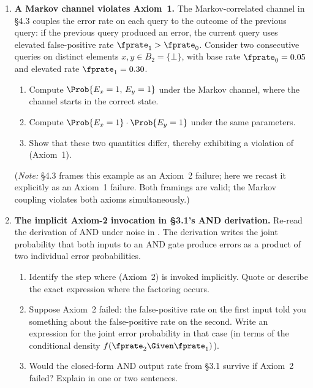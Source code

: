 \begin{enumerate}
\item \exstarstar
\textbf{A Markov channel violates Axiom~1.}
The Markov-correlated channel in §4.3 couples the error rate on each query
to the outcome of the previous query: if the previous query produced an error,
the current query uses elevated false-positive rate $\fprate_1 > \fprate_0$.
Consider two consecutive queries on distinct elements $x, y \in B_2 = \{\bot\}$,
with base rate $\fprate_0 = 0.05$ and elevated rate $\fprate_1 = 0.30$.
\begin{enumerate}
  \item[(a)] Compute $\Prob{E_x = 1,\, E_y = 1}$ under the Markov channel,
    where the channel starts in the correct state.
  \item[(b)] Compute $\Prob{E_x = 1} \cdot \Prob{E_y = 1}$ under the same
    parameters.
  \item[(c)] Show that these two quantities differ, thereby exhibiting a
    violation of  (Axiom~1).
\end{enumerate}
(\textit{Note:} §4.3 frames this example as an Axiom~2 failure; here we recast
it explicitly as an Axiom~1 failure. Both framings are valid; the Markov
coupling violates both axioms simultaneously.)

\item \exstarstar
\textbf{The implicit Axiom-2 invocation in §3.1's AND derivation.}
Re-read the derivation of AND under noise in .
The derivation writes the joint probability that both inputs to an AND gate
produce errors as a product of two individual error probabilities.
\begin{enumerate}
  \item[(a)] Identify the step where  (Axiom~2)
    is invoked implicitly. Quote or describe the exact expression where
    the factoring occurs.
  \item[(b)] Suppose Axiom~2 failed: the false-positive rate on the first
    input told you something about the false-positive rate on the second.
    Write an expression for the joint error probability in that case
    (in terms of the conditional density $f(\fprate_2 \Given \fprate_1)$).
  \item[(c)] Would the closed-form AND output rate from §3.1 survive if
    Axiom~2 failed? Explain in one or two sentences.
\end{enumerate}


\end{enumerate}
